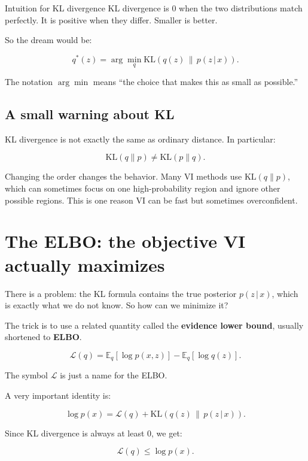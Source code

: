 \documentclass[11pt]{article}
\newcommand{\E}{\mathbb{E}}
\newcommand{\KL}{\mathrm{KL}}
\newcommand{\given}{\,|\,}
\begin{document}
\begin{idea}{Intuition for KL divergence}
KL divergence is $0$ when the two distributions match perfectly. It is positive when they differ. Smaller is better.
\end{idea}

So the dream would be:

\[
q^*(z) = \arg\min_{q} \KL(q(z)\,\|\,p(z \given x)).
\]

The notation $\arg\min$ means ``the choice that makes this as small as possible.''

\subsection{A small warning about KL}

KL divergence is not exactly the same as ordinary distance. In particular:

\[
\KL(q\|p) \ne \KL(p\|q).
\]

Changing the order changes the behavior. Many VI methods use $\KL(q\|p)$, which can sometimes focus on one high-probability region and ignore other possible regions. This is one reason VI can be fast but sometimes overconfident.

\section{The ELBO: the objective VI actually maximizes}

There is a problem: the KL formula contains the true posterior $p(z \given x)$, which is exactly what we do not know.
So how can we minimize it?

The trick is to use a related quantity called the \textbf{evidence lower bound}, usually shortened to \textbf{ELBO}.

\begin{equation}
\boxed{
\mathcal{L}(q)
= \E_q[\log p(x,z)] - \E_q[\log q(z)].
}
\end{equation}

The symbol $\mathcal{L}$ is just a name for the ELBO.

A very important identity is:

\begin{equation}
\boxed{
\log p(x) = \mathcal{L}(q) + \KL(q(z)\,\|\,p(z \given x)).
}
\end{equation}

Since KL divergence is always at least $0$, we get:

\[
\mathcal{L}(q) \le \log p(x).
\]
\end{document}
